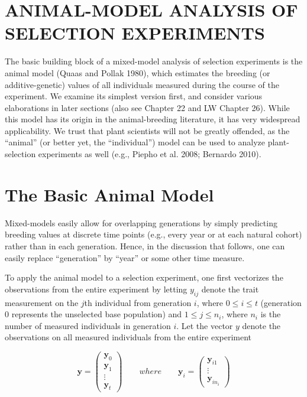 \documentclass{article}
\begin{document}
\section{ANIMAL-MODEL ANALYSIS OF SELECTION EXPERIMENTS}
The basic building block of a mixed-model analysis of selection experiments is the animal model (Quaas and Pollak 1980), which estimates the breeding (or additive-genetic) values of all individuals measured during the course of the experiment. We examine its simplest version first, and consider various elaborations in later sections (also see Chapter 22 and LW Chapter 26). While this model has its origin in the animal-breeding literature, it has very widespread applicability. We trust that plant scientists will not be greatly offended, as the “animal” (or better yet, the “individual”) model can be used to analyze plant-selection experiments as well (e.g., Piepho et al. 2008; Bernardo 2010).

\section{The Basic Animal Model}
Mixed-models easily allow for overlapping generations by simply predicting breeding values at discrete time points (e.g., every year or at each natural cohort) rather than in each generation. Hence, in the discussion that follows, one can easily replace “generation” by “year” or some other time measure.

To apply the animal model to a selection experiment, one first vectorizes the observations from the entire experiment by letting  $ y_{ij} $ denote the trait measurement on the  $ j $th individual from generation  $ i $, where  $ 0 \leq i \leq t $ (generation 0 represents the unselected base population) and  $ 1 \leq j \leq n_i $, where  $ n_i $ is the number of measured individuals in generation  $ i $. Let the vector  $ y $ denote the observations on all measured individuals from the entire experiment

\begin{equation}
\mathbf{y}=\begin{pmatrix}\mathbf{y}_{0}\\ \mathbf{y}_{1}\\ \vdots\\ \mathbf{y}_{t}\end{pmatrix}\qquad where\qquad\mathbf{y}_{i}=\begin{pmatrix}\mathbf{y}_{i1}\\ \vdots\\ \mathbf{y}_{in_{i}}\end{pmatrix}
\end{equation}
\end{document}
